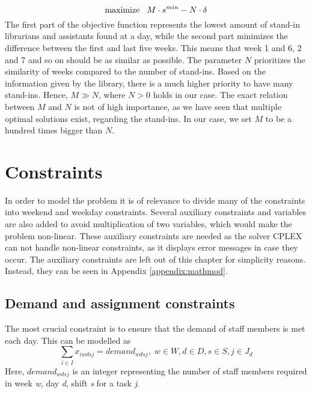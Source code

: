 \begin{equation} \label{objfcn}
\text{maximize} \hspace{0.3cm} M\cdot s^{min} - N \cdot \delta
\end{equation}
The first part of the objective function represents the lowest amount of stand-in librarians and assistants found at a day, while the second part minimizes the difference between the first and last five weeks. This means that week 1 and 6, 2 and 7 and so on should be as similar as possible. The parameter $N$ prioritizes the similarity of weeks compared to the number of stand-ins. Based on the information given by the library, there is a much higher priority to have many stand-ins. Hence, $M \gg N$, where $N > 0$ holds in our case. The exact relation between $M$ and $N$ is not of high importance, as we have seen that multiple optimal solutions exist, regarding the stand-ins. In our case, we set $M$ to be a hundred times bigger than $N$.




\section{Constraints} \label{constraints}
In order to model the problem it is of relevance to divide many of the constraints into weekend and weekday constraints. Several auxiliary constraints and variables are also added to avoid multiplication of two variables, which would make the problem non-linear. These auxiliary constraints are needed as the solver CPLEX can not handle non-linear constraints, as it displays error messages in case they occur. The auxiliary constraints are left out of this chapter for simplicity reasons. Instead, they can be seen in Appendix \ref{appendix:mathmod}.

\subsection{Demand and assignment constraints} \label{section:demand_ass_constraints}
The most crucial constraint is to ensure that the demand of staff members is met each day. This can be modelled as
\begin{equation} \label{eq:demand}
\sum_{i \in I} x_{iwdsj} = demand_{wdsj}, \;   w\in W,d\in D,s\in S,j\in J_d
\end{equation}
Here, $demand_{wdsj}$ is an integer representing the number of staff members required in week \textit{w}, day \textit{d}, shift \textit{s} for a task \textit{j}.

